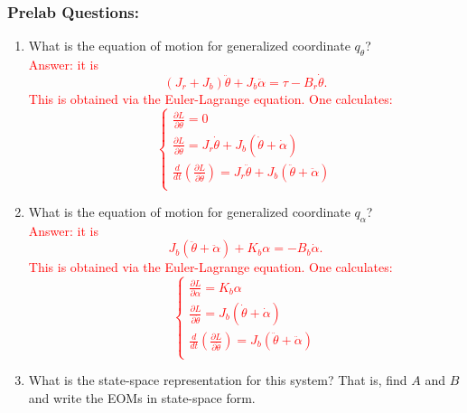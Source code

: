\documentclass[12pt]{report}
\newcommand\drew[1]{\textcolor{red}{#1}}
\newcommand{\pder}[2]{\frac{\partial #1}{\partial #2}}
\begin{document}
\subsubsection{Prelab Questions:}\label{subsubsection:lab1a_prelab}
\begin{enumerate}
    \item What is the equation of motion for generalized coordinate $q_\theta$?\\
          \drew{Answer: it is
              \[
                  \left(J_r + J_b\right)\ddot{\theta} + J_b \ddot{\alpha} = \tau - B_r \dot{\theta}.
              \]
              This is obtained via the Euler-Lagrange equation. One calculates:
              \[
                  \begin{cases}
                      \pder{L}{\theta}=0                                                                                             \\
                      \pder{L}{\dot{\theta}}=J_r\dot{\theta}+J_b\left(\dot{\theta}+\dot{\alpha}\right)                               \\
                      \frac{d}{dt} \left(\pder{L}{\dot{\theta}}\right)= J_r\ddot{\theta}+J_b\left(\ddot{\theta}+\ddot{\alpha}\right) \\
                  \end{cases}
              \]}
    \item What is the equation of motion for generalized coordinate $q_\alpha$?\\
          \drew{Answer: it is
              \[
                  J_b \left(\ddot{\theta} + \ddot{\alpha}\right) + K_b \alpha = -B_b \dot{\alpha}.
              \]
              This is obtained via the Euler-Lagrange equation. One calculates:
              \[
                  \begin{cases}
                      \pder{L}{\alpha}=K_b\alpha                                                                    \\
                      \pder{L}{\dot{\theta}}=J_b\left(\dot{\theta}+\dot{\alpha}\right)                              \\
                      \frac{d}{dt} \left(\pder{L}{\dot{\theta}}\right)= J_b\left(\ddot{\theta}+\ddot{\alpha}\right) \\
                  \end{cases}
              \]}
    \item What is the state-space representation for this system? That is, find $A$ and $B$ and write the EOMs in state-space form.\\

\end{enumerate}
\end{document}
